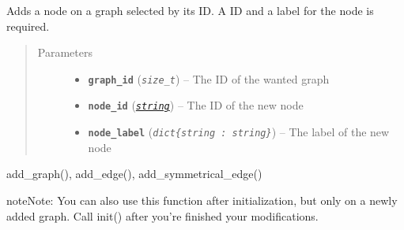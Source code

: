 \documentclass[letterpaper,10pt,english]{sphinxmanual}
\begin{document}
\begin{fulllineitems}
\label{doc:gedlibpy.add_node}
Adds a node on a graph selected by its ID. A ID and a label for the node is required.
\begin{quote}\begin{description}
\item[{Parameters}] \leavevmode\begin{itemize}
\item {} 
\textbf{\texttt{graph\_id}} (\emph{\texttt{size\_t}}) -- The ID of the wanted graph

\item {} 
\textbf{\texttt{node\_id}} (\href{https://docs.python.org/3/library/string.html\#module-string}{\emph{\texttt{string}}}) -- The ID of the new node

\item {} 
\textbf{\texttt{node\_label}} (\emph{\texttt{dict\{string : string\}}}) -- The label of the new node

\end{itemize}

\end{description}\end{quote}




add\_graph(), add\_edge(), add\_symmetrical\_edge()



\begin{notice}{note}{Note:}
You can also use this function after initialization, but only on a newly added graph. Call init() after you're finished your modifications.
\end{notice}

\end{fulllineitems}

\end{document}
